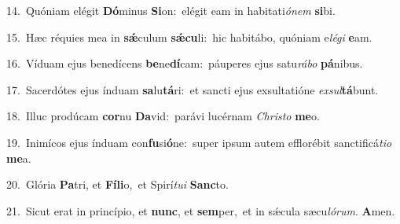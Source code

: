 {\numbfont\textcolor{\numbcolor}{14.}}~Quóniam elégit \textbf{Dó}\-minus \textbf{Si}\-on:~\star elégit eam in habitati\-\textit{ó}\-\textit{nem} \textbf{si}\-bi.\par
{\numbfont\textcolor{\numbcolor}{15.}}~Hæc réquies mea in \textbf{sǽ}\-culum \textbf{sǽ}\-\textbf{cu}li:~\star hic habitábo, quóniam e\-\textit{lé}\-\textit{gi} \textbf{e}\-am.\par
{\numbfont\textcolor{\numbcolor}{16.}}~Víduam ejus benedícens \textbf{be}\-ne\-\textbf{dí}\-cam:~\star páuperes ejus satu\-\textit{rá}\-\textit{bo} \textbf{pá}\-nibus.\par
{\numbfont\textcolor{\numbcolor}{17.}}~Sacerdótes ejus índuam \textbf{sa}\-lu\-\textbf{tá}\-ri:~\star et sancti ejus exsultatióne \textit{ex}\-\textit{sul}\textbf{tá}bunt.\par
{\numbfont\textcolor{\numbcolor}{18.}}~Illuc prodúcam \textbf{cor}\-nu \textbf{Da}\-vid:~\star parávi lucérnam \textit{Chris}\-\textit{to} \textbf{me}\-o.\par
{\numbfont\textcolor{\numbcolor}{19.}}~Inimícos ejus índuam con\-\textbf{fu}\-si\-\textbf{ó}\-ne:~\star super ipsum autem efflorébit sanctificá\-\textit{ti}\-\textit{o} \textbf{me}\-a.\par
{\numbfont\textcolor{\numbcolor}{20.}}~Glória \textbf{Pa}\-tri, et \textbf{Fí}\-\textbf{li}o,~\star et Spirí\-\textit{tu}\-\textit{i} \textbf{Sanc}\-to.\par
{\numbfont\textcolor{\numbcolor}{21.}}~Sicut erat in princípio, et \textbf{nunc}\-, et \textbf{sem}\-per,~\star et in sǽcula sæcu\-\textit{ló}\-\textit{rum}. \textbf{A}\-men.\par
